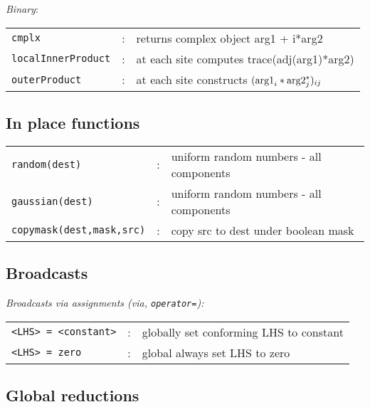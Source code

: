 \documentclass[12pt,letterpaper]{article}
\begin{document}
\noindent
{\em Binary}:

\begin{flushleft}
\begin{tabular}{lcp{4.0in}}
\verb|cmplx|              &:& returns complex object   arg1 + i*arg2\\
\verb|localInnerProduct|  &:& at each site computes trace(adj(arg1)*arg2)\\
\verb|outerProduct|       &:& at each site constructs $({\rm arg1}_i * {\rm arg2}_j^*)_{ij}$\\
\end{tabular}
\end{flushleft}

\subsection{In place functions}
\label{sec:inplace}

\begin{flushleft}
\begin{tabular}{lcp{4.0in}}
\verb|random(dest)|            &:& uniform random numbers - all components\\
\verb|gaussian(dest)|          &:& uniform random numbers - all components\\
\verb|copymask(dest,mask,src)| &:& copy src to dest under boolean mask\\
\end{tabular}
\end{flushleft}


\medskip

\subsection{Broadcasts}
\label{sec:broadcasts}

{\em Broadcasts via assignments (via, {\tt operator=}):}
\begin{flushleft}
\begin{tabular}{lcp{4.0in}}
\verb|<LHS> = <constant>| &:& globally set conforming LHS to constant\\
\verb|<LHS> = zero|       &:& global always set LHS to zero\\
\end{tabular}
\end{flushleft}

\medskip

\subsection{Global reductions}
\label{sec:reductions}
\end{document}
